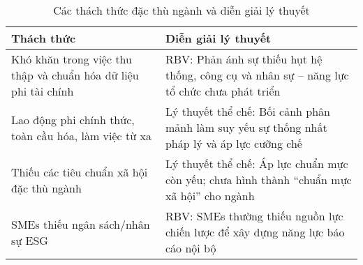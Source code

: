 \begin{table}[H]
\centering
\caption{Các thách thức đặc thù ngành và diễn giải lý thuyết}
\begin{tabular}{p{6cm}|p{8cm}}
\textbf{Thách thức} & \textbf{Diễn giải lý thuyết} \\
\hline
Khó khăn trong việc thu thập và chuẩn hóa dữ liệu phi tài chính & RBV: Phản ánh sự thiếu hụt hệ thống, công cụ và nhân sự – năng lực tổ chức chưa phát triển \\
\hline
Lao động phi chính thức, toàn cầu hóa, làm việc từ xa & Lý thuyết thể chế: Bối cảnh phân mảnh làm suy yếu sự thống nhất pháp lý và áp lực cưỡng chế \\
\hline
Thiếu các tiêu chuẩn xã hội đặc thù ngành & Lý thuyết thể chế: Áp lực chuẩn mực còn yếu; chưa hình thành “chuẩn mực xã hội” cho ngành \\
\hline
SMEs thiếu ngân sách/nhân sự ESG & RBV: SMEs thường thiếu nguồn lực chiến lược để xây dựng năng lực báo cáo nội bộ \\
\end{tabular}
\end{table}

